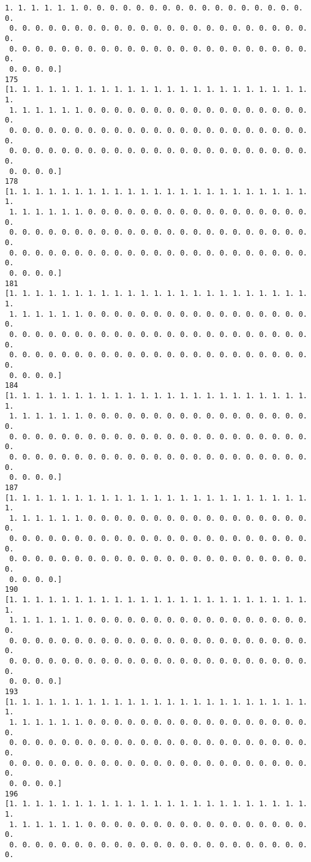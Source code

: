 \documentclass[11pt]{article}
\begin{document}
\begin{Verbatim}[commandchars=\\\{\}]
 1. 1. 1. 1. 1. 1. 0. 0. 0. 0. 0. 0. 0. 0. 0. 0. 0. 0. 0. 0. 0. 0. 0. 0.
 0. 0. 0. 0. 0. 0. 0. 0. 0. 0. 0. 0. 0. 0. 0. 0. 0. 0. 0. 0. 0. 0. 0. 0.
 0. 0. 0. 0. 0. 0. 0. 0. 0. 0. 0. 0. 0. 0. 0. 0. 0. 0. 0. 0. 0. 0. 0. 0.
 0. 0. 0. 0.]
175
[1. 1. 1. 1. 1. 1. 1. 1. 1. 1. 1. 1. 1. 1. 1. 1. 1. 1. 1. 1. 1. 1. 1. 1.
 1. 1. 1. 1. 1. 1. 0. 0. 0. 0. 0. 0. 0. 0. 0. 0. 0. 0. 0. 0. 0. 0. 0. 0.
 0. 0. 0. 0. 0. 0. 0. 0. 0. 0. 0. 0. 0. 0. 0. 0. 0. 0. 0. 0. 0. 0. 0. 0.
 0. 0. 0. 0. 0. 0. 0. 0. 0. 0. 0. 0. 0. 0. 0. 0. 0. 0. 0. 0. 0. 0. 0. 0.
 0. 0. 0. 0.]
178
[1. 1. 1. 1. 1. 1. 1. 1. 1. 1. 1. 1. 1. 1. 1. 1. 1. 1. 1. 1. 1. 1. 1. 1.
 1. 1. 1. 1. 1. 1. 0. 0. 0. 0. 0. 0. 0. 0. 0. 0. 0. 0. 0. 0. 0. 0. 0. 0.
 0. 0. 0. 0. 0. 0. 0. 0. 0. 0. 0. 0. 0. 0. 0. 0. 0. 0. 0. 0. 0. 0. 0. 0.
 0. 0. 0. 0. 0. 0. 0. 0. 0. 0. 0. 0. 0. 0. 0. 0. 0. 0. 0. 0. 0. 0. 0. 0.
 0. 0. 0. 0.]
181
[1. 1. 1. 1. 1. 1. 1. 1. 1. 1. 1. 1. 1. 1. 1. 1. 1. 1. 1. 1. 1. 1. 1. 1.
 1. 1. 1. 1. 1. 1. 0. 0. 0. 0. 0. 0. 0. 0. 0. 0. 0. 0. 0. 0. 0. 0. 0. 0.
 0. 0. 0. 0. 0. 0. 0. 0. 0. 0. 0. 0. 0. 0. 0. 0. 0. 0. 0. 0. 0. 0. 0. 0.
 0. 0. 0. 0. 0. 0. 0. 0. 0. 0. 0. 0. 0. 0. 0. 0. 0. 0. 0. 0. 0. 0. 0. 0.
 0. 0. 0. 0.]
184
[1. 1. 1. 1. 1. 1. 1. 1. 1. 1. 1. 1. 1. 1. 1. 1. 1. 1. 1. 1. 1. 1. 1. 1.
 1. 1. 1. 1. 1. 1. 0. 0. 0. 0. 0. 0. 0. 0. 0. 0. 0. 0. 0. 0. 0. 0. 0. 0.
 0. 0. 0. 0. 0. 0. 0. 0. 0. 0. 0. 0. 0. 0. 0. 0. 0. 0. 0. 0. 0. 0. 0. 0.
 0. 0. 0. 0. 0. 0. 0. 0. 0. 0. 0. 0. 0. 0. 0. 0. 0. 0. 0. 0. 0. 0. 0. 0.
 0. 0. 0. 0.]
187
[1. 1. 1. 1. 1. 1. 1. 1. 1. 1. 1. 1. 1. 1. 1. 1. 1. 1. 1. 1. 1. 1. 1. 1.
 1. 1. 1. 1. 1. 1. 0. 0. 0. 0. 0. 0. 0. 0. 0. 0. 0. 0. 0. 0. 0. 0. 0. 0.
 0. 0. 0. 0. 0. 0. 0. 0. 0. 0. 0. 0. 0. 0. 0. 0. 0. 0. 0. 0. 0. 0. 0. 0.
 0. 0. 0. 0. 0. 0. 0. 0. 0. 0. 0. 0. 0. 0. 0. 0. 0. 0. 0. 0. 0. 0. 0. 0.
 0. 0. 0. 0.]
190
[1. 1. 1. 1. 1. 1. 1. 1. 1. 1. 1. 1. 1. 1. 1. 1. 1. 1. 1. 1. 1. 1. 1. 1.
 1. 1. 1. 1. 1. 1. 0. 0. 0. 0. 0. 0. 0. 0. 0. 0. 0. 0. 0. 0. 0. 0. 0. 0.
 0. 0. 0. 0. 0. 0. 0. 0. 0. 0. 0. 0. 0. 0. 0. 0. 0. 0. 0. 0. 0. 0. 0. 0.
 0. 0. 0. 0. 0. 0. 0. 0. 0. 0. 0. 0. 0. 0. 0. 0. 0. 0. 0. 0. 0. 0. 0. 0.
 0. 0. 0. 0.]
193
[1. 1. 1. 1. 1. 1. 1. 1. 1. 1. 1. 1. 1. 1. 1. 1. 1. 1. 1. 1. 1. 1. 1. 1.
 1. 1. 1. 1. 1. 1. 0. 0. 0. 0. 0. 0. 0. 0. 0. 0. 0. 0. 0. 0. 0. 0. 0. 0.
 0. 0. 0. 0. 0. 0. 0. 0. 0. 0. 0. 0. 0. 0. 0. 0. 0. 0. 0. 0. 0. 0. 0. 0.
 0. 0. 0. 0. 0. 0. 0. 0. 0. 0. 0. 0. 0. 0. 0. 0. 0. 0. 0. 0. 0. 0. 0. 0.
 0. 0. 0. 0.]
196
[1. 1. 1. 1. 1. 1. 1. 1. 1. 1. 1. 1. 1. 1. 1. 1. 1. 1. 1. 1. 1. 1. 1. 1.
 1. 1. 1. 1. 1. 1. 0. 0. 0. 0. 0. 0. 0. 0. 0. 0. 0. 0. 0. 0. 0. 0. 0. 0.
 0. 0. 0. 0. 0. 0. 0. 0. 0. 0. 0. 0. 0. 0. 0. 0. 0. 0. 0. 0. 0. 0. 0. 0.

\end{Verbatim}
\end{document}
